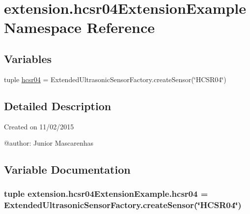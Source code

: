 \hypertarget{namespaceextension_1_1hcsr04ExtensionExample}{}\section{extension.\+hcsr04\+Extension\+Example Namespace Reference}
\label{namespaceextension_1_1hcsr04ExtensionExample}
\subsection*{Variables}
\begin{DoxyCompactItemize}
\item 
tuple \hyperlink{namespaceextension_1_1hcsr04ExtensionExample_a5d51d12a03fdd93c0aa6f2bffc25d3d5}{hcsr04} = Extended\+Ultrasonic\+Sensor\+Factory.\+create\+Sensor(\char`\"{}H\+C\+S\+R04\char`\"{})
\end{DoxyCompactItemize}


\subsection{Detailed Description}
\begin{DoxyVerb}Created on 11/02/2015

@author: Junior Mascarenhas
\end{DoxyVerb}
 

\subsection{Variable Documentation}
\hypertarget{namespaceextension_1_1hcsr04ExtensionExample_a5d51d12a03fdd93c0aa6f2bffc25d3d5}{}
\subsubsection[{hcsr04}]{\setlength{\rightskip}{0pt plus 5cm}tuple extension.\+hcsr04\+Extension\+Example.\+hcsr04 = Extended\+Ultrasonic\+Sensor\+Factory.\+create\+Sensor(\char`\"{}H\+C\+S\+R04\char`\"{})}\label{namespaceextension_1_1hcsr04ExtensionExample_a5d51d12a03fdd93c0aa6f2bffc25d3d5}
